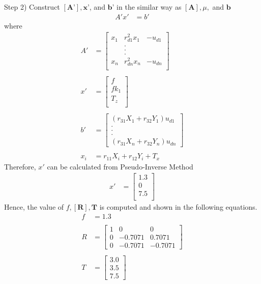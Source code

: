 \documentclass[]{article}
\begin{document}
\newpage
Step 2) Construct $[\textbf{A'}], \textbf{x'}$, and $\textbf{b'}$ in the similar way as  $[\textbf{A}], \mu,$ and $\textbf{b}$
\begin{align*}
A'x' &= b'
\end{align*}
where
\begin{align*}
A' &=
\begin{bmatrix}
x_1 & r_{d1}^2x_1 & -u_{d1}\\
& . &\\
& . & \\
& . & \\
x_n & r_{dn}^2x_n & -u_{dn}\\
\end{bmatrix}\\
\\
x' &=
\begin{bmatrix}
f\\
fk_1\\
T_z\\
\end{bmatrix}\\
\\
b' &= 
\begin{bmatrix}
(r_{31}X_1+r_{32}Y_1)u_{d1}\\
.\\
.\\
.\\
(r_{31}X_n+r_{32}Y_n)u_{dn}
\end{bmatrix}\\
\\
x_i &= r_{11}X_i+r_{12}Y_i+T_x
\end{align*}
\indent Therefore, $x'$ can be calculated from Pseudo-Inverse Method
\begin{align*}
x' &=
\begin{bmatrix}
1.3\\
0\\
7.5\\
\end{bmatrix}
\end{align*}
\indent Hence, the value of $f, [\textbf{R}], \textbf{T}$ is computed and shown in the following equations.\\	
\begin{align*}
f &= 1.3\\
\\
R &=
\begin{bmatrix}
1 & 0 & 0\\
0 & -0.7071 & 0.7071\\
0 & -0.7071 & -0.7071
\end{bmatrix}\\
\\
T &=
\begin{bmatrix}
3.0\\
3.5\\
7.5
\end{bmatrix}\\
\end{align*}
\end{document}
